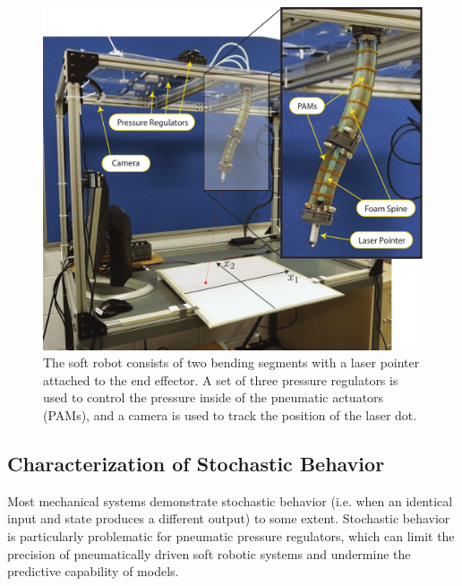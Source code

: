 \begin{figure}
    \centering
    \includegraphics[width=\linewidth]{figures/rig_N_robot_smaller.pdf}
    \caption{The soft robot consists of two bending segments with a laser pointer attached to the end effector. A set of three pressure regulators is used to control the pressure inside of the pneumatic actuators (PAMs), and a camera is used to track the position of the laser dot.}
    \label{fig:rig}
    \vspace*{-0.5cm}
\end{figure}

\subsection{Characterization of Stochastic Behavior}
\label{sec:noise}

Most mechanical systems demonstrate stochastic behavior (i.e. when an identical input and state produces a different output) to some extent.
Stochastic behavior is particularly problematic for pneumatic pressure regulators, which can limit the precision of pneumatically driven soft robotic systems
and undermine the predictive capability of models.

